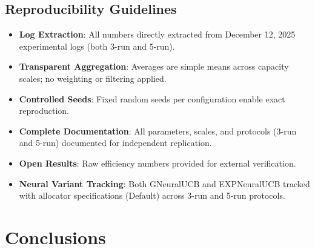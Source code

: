 \documentclass[12pt,a4paper]{article}
\begin{document}
\subsection{Reproducibility Guidelines}
\begin{itemize}
\item \textbf{Log Extraction}: All numbers directly extracted from December 12, 2025 experimental logs (both 3-run and 5-run).
\item \textbf{Transparent Aggregation}: Averages are simple means across capacity scales; no weighting or filtering applied.
\item \textbf{Controlled Seeds}: Fixed random seeds per configuration enable exact reproduction.
\item \textbf{Complete Documentation}: All parameters, scales, and protocols (3-run and 5-run) documented for independent replication.
\item \textbf{Open Results}: Raw efficiency numbers provided for external verification.
\item \textbf{Neural Variant Tracking}: Both GNeuralUCB and EXPNeuralUCB tracked with allocator specifications (Default) across 3-run and 5-run protocols.
\end{itemize}

\newpage
\section{Conclusions}
\end{document}
